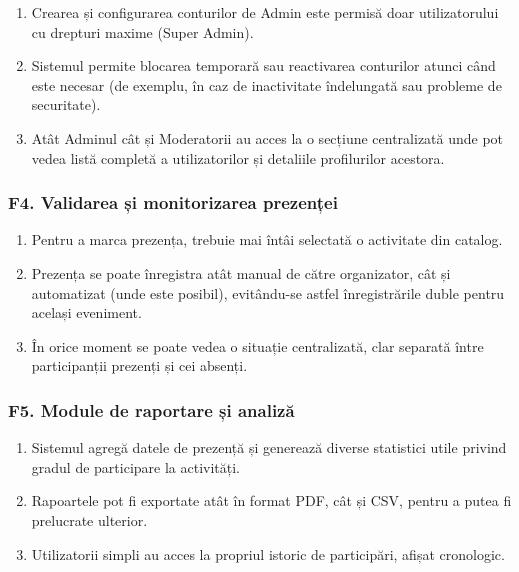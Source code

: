 \documentclass[a4paper,12pt,oneside]{report}
\begin{document}
\begin{enumerate}[label=\textbf{F3.\arabic*}]
    \item Crearea și configurarea conturilor de Admin este permisă doar utilizatorului cu drepturi maxime (Super Admin).
    
    \item Sistemul permite blocarea temporară sau reactivarea conturilor atunci când este necesar (de exemplu, în caz de inactivitate îndelungată sau probleme de securitate).
    
    \item Atât Adminul cât și Moderatorii au acces la o secțiune centralizată unde pot vedea listă completă a utilizatorilor și detaliile profilurilor acestora.
\end{enumerate}

\subsubsection*{F4. Validarea și monitorizarea prezenței}

\begin{enumerate}[label=\textbf{F4.\arabic*}]
    \item Pentru a marca prezența, trebuie mai întâi selectată o activitate din catalog.
    
    \item Prezența se poate înregistra atât manual de către organizator, cât și automatizat (unde este posibil), evitându-se astfel înregistrările duble pentru același eveniment.
    
    \item În orice moment se poate vedea o situație centralizată, clar separată între participanții prezenți și cei absenți.
\end{enumerate}

\subsubsection*{F5. Module de raportare și analiză}

\begin{enumerate}[label=\textbf{F5.\arabic*}]
    \item Sistemul agregă datele de prezență și generează diverse statistici utile privind gradul de participare la activități.
    
    \item Rapoartele pot fi exportate atât în format PDF, cât și CSV, pentru a putea fi prelucrate ulterior.
    
    \item Utilizatorii simpli au acces la propriul istoric de participări, afișat cronologic.
\end{enumerate}
\end{document}
